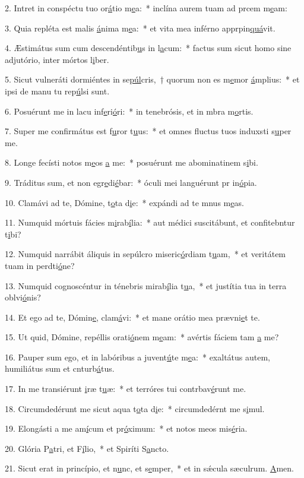 2. Intret in conspéctu tuo or\uline{á}tio m\uline{e}a:~* inclína aurem tuam ad prcem m\uline{e}am:\par 
3. Quia repléta est malis \uline{á}nima m\uline{e}a:~* et vita mea inférno apprpin\uline{quá}vit.\par 
4. Æstimátus sum cum descendéntib\uline{u}s in l\uline{a}cum:~* factus sum sicut homo sine adjutório, inter mórtos l\uline{i}ber.\par 
5. Sicut vulneráti dormiéntes in se\uline{púl}cris,~† quorum non es m\uline{e}mor \uline{á}mplius:~* et ipsi de manu tu rep\uline{ú}lsi sunt.\par 
6. Posuérunt me in lacu inf\uline{e}ri\uline{ó}ri:~* in tenebrósis, et in mbra m\uline{o}rtis.\par 
7. Super me confirmátus est f\uline{u}ror t\uline{u}us:~* et omnes fluctus tuos induxsti s\uline{u}per me.\par 
8. Longe fecísti notos m\uline{e}os \uline{a} me:~* posuérunt me abominatinem s\uline{i}bi.\par 
9. Tráditus sum, et non egr\uline{e}di\uline{é}bar:~* óculi mei languérunt pr in\uline{ó}pia.\par 
10. Clamávi ad te, Dómine, t\uline{o}ta d\uline{i}e:~* expándi ad te mnus m\uline{e}as.\par 
11. Numquid mórtuis fácies m\uline{i}rab\uline{í}lia:~* aut médici suscitábunt, et confitebntur t\uline{i}bi?\par 
12. Numquid narrábit áliquis in sepúlcro miseric\uline{ó}rdiam t\uline{u}am,~* et veritátem tuam in perdti\uline{ó}ne?\par 
13. Numquid cognoscéntur in ténebris mirab\uline{í}lia t\uline{u}a,~* et justítia tua in terra oblvi\uline{ó}nis?\par 
14. Et ego ad te, Dómin\uline{e}, clam\uline{á}vi:~* et mane orátio mea prævni\uline{e}t te.\par 
15. Ut quid, Dómine, repéllis orati\uline{ó}nem m\uline{e}am:~* avértis fáciem tam \uline{a} me?\par 
16. Pauper sum ego, et in labóribus a juvent\uline{ú}te m\uline{e}a:~* exaltátus autem, humiliátus sum et cnturb\uline{á}tus.\par 
17. In me transiérunt \uline{i}ræ t\uline{u}æ:~* et terróres tui contrbav\uline{é}runt me.\par 
18. Circumdedérunt me sicut aqua t\uline{o}ta d\uline{i}e:~* circumdedérnt me s\uline{i}mul.\par 
19. Elongásti a me am\uline{í}cum et pr\uline{ó}ximum:~* et notos meos  mis\uline{é}ria.\par 
20. Glória P\uline{a}tri, et F\uline{í}lio,~* et Spiríti S\uline{a}ncto.\par 
21. Sicut erat in princípio, et n\uline{u}nc, et s\uline{e}mper,~* et in sǽcula sæculrum. \uline{A}men.\par 
